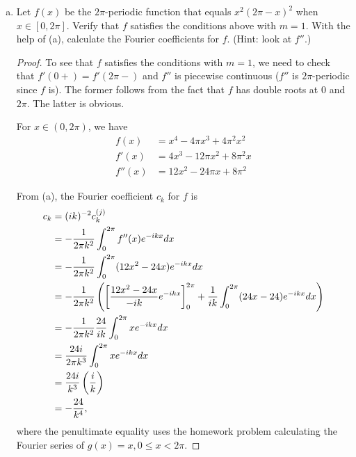 \documentclass{article}
\begin{document}
\begin{enumerate}[(a)]
\item Let $f(x)$ be the $2\pi$-periodic function that equals $x^2(2 \pi - x)^2$ when $x \in [0,2 \pi]$. Verify that $f$ satisfies the conditions above with $m = 1$. With the help of (a), calculate the Fourier coefficients for $f$. (Hint: look at $f''$.)

\begin{proof}
To see that $f$ satisfies the conditions with $m=1$, we need to check that  $f'(0+) = f'(2\pi -)$ and $f''$ is piecewise continuous ($f''$ is $2 \pi$-periodic since $f$ is). The former follows from the fact that $f$ has double roots at $0$ and $2 \pi$.  The latter is obvious.

For $x \in (0, 2\pi)$, we have 
\begin{align*}
f(x) & = x^4 - 4 \pi x^3 + 4 \pi^2 x^2
\\ f'(x) & = 4x^3 - 12 \pi x^2 + 8 \pi^2 x
\\ f''(x) & = 12x^2 - 24 \pi x + 8 \pi^2 
\end{align*}

From (a), the Fourier coefficient $c_k$ for $f$ is
\begin{align*}
c_k & = (ik)^{-2} c_k^{(j)}
\\  & = -\frac 1 {2 \pi k^2} \int_0^{2\pi} f''(x) e^{-ikx} dx
\\  & = -\frac 1 {2 \pi k^2} \int_0^{2\pi} (12x^2 - 24x) e^{-ikx} dx
\\  & = -\frac {1} {2 \pi k^2}  \left( \left[ \frac{12x^2 - 24x}{-ik} e^{-ikx}\right]_0^{2\pi}  + \frac 1 {ik} \int_0^{2 \pi} (24x - 24)e^{-ikx} dx \right)
\\  & = -\frac {1} {2 \pi k^2}  \frac {24} {ik} \int_0^{2 \pi} xe^{-ikx} dx
\\  & = \frac {24i} {2 \pi k^3} \int_0^{2\pi} x e^{-ikx} dx
\\  & = \frac {24i} {k^3} \left( \frac i k \right)
\\ & = - \frac{24} {k^4},
\end{align*}
where the penultimate equality uses the homework problem calculating the Fourier series of $g(x) = x, 0 \le x < 2 \pi$.
\end{proof}


\end{enumerate}
\end{document}
